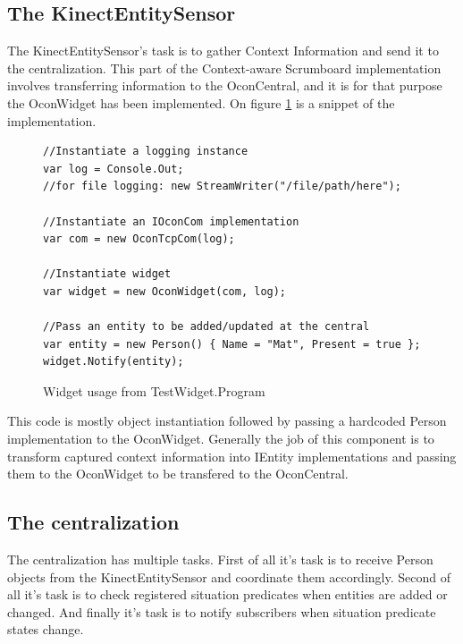 \documentclass[../report.tex]{subfiles}
\begin{document}
\newpage

\subsection{The KinectEntitySensor}
The KinectEntitySensor's task is to gather Context Information and send it to the centralization. This part of the Context-aware Scrumboard implementation involves transferring information to the OconCentral, and it is for that purpose the OconWidget has been implemented. On figure \ref{code:OconWidget} is a snippet of the implementation.
\begin{figure}[H]
\begin{lstlisting}
//Instantiate a logging instance
var log = Console.Out;
//for file logging: new StreamWriter("/file/path/here");

//Instantiate an IOconCom implementation
var com = new OconTcpCom(log);

//Instantiate widget
var widget = new OconWidget(com, log);

//Pass an entity to be added/updated at the central
var entity = new Person() { Name = "Mat", Present = true };
widget.Notify(entity);
\end{lstlisting}
\caption{Widget usage from TestWidget.Program}
\label{code:OconWidget}
\end{figure}

This code is mostly object instantiation followed by passing a hardcoded Person implementation to the OconWidget. Generally the job of this component is to transform captured context information into IEntity implementations and passing them to the OconWidget to be transfered to the OconCentral.



\newpage


\subsection{The centralization}


The centralization has multiple tasks. First of all it's task is to receive Person objects from the KinectEntitySensor and coordinate them accordingly. Second of all it's task is to check registered situation predicates when entities are added or changed. And finally it's task is to notify subscribers when situation predicate states change.
\end{document}
